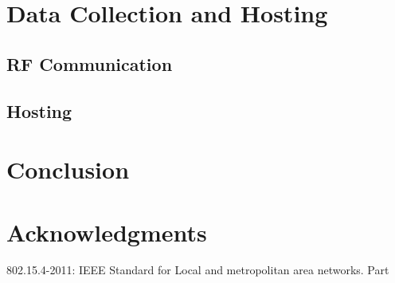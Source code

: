 \documentclass[conference]{IEEEtran}
\begin{document}
\section{Data Collection and Hosting}
\label{sec:collection}


\subsection{RF Communication}



\subsection{Hosting}



\section{Conclusion}
\label{sec:conclusion}

\section*{Acknowledgments}





\begin{thebibliography}{10}
    802.15.4-2011: IEEE Standard for Local and metropolitan area networks. Part
\end{thebibliography}
\end{document}
